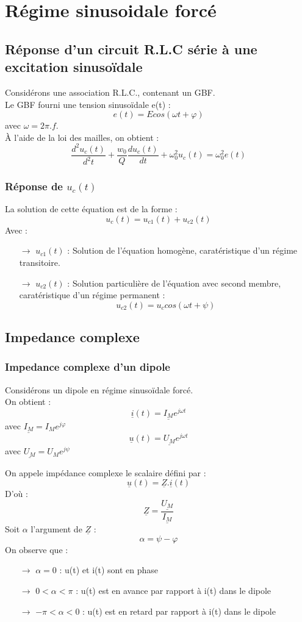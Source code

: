 \chapter{Régime sinusoidale forcé}
\section{Réponse d'un circuit R.L.C série à une excitation sinusoïdale}
Considérons une association R.L.C., contenant un GBF.\\
Le GBF fourni une tension sinusoïdale e(t) :
$$e(t) = Ecos(\omega t +\varphi)$$
avec $\omega = 2\pi.f$.\\
À l'aide de la loi des mailles, on obtient :
$$\dfrac{d^2u_c(t)}{d^2t} + \dfrac{w_0}{Q}\dfrac{du_c(t)}{dt} + \omega_0^2u_c(t) = \omega_0^2e(t)$$
\subsection{Réponse de $u_c(t)$}
La solution de cette équation est de la forme :
$$u_c(t) = u_{c1}(t) + u_{c2}(t)$$
Avec : 
\begin{itemize}
 \item[$\rightarrow$] $u_{c1}(t)$ : Solution de l'équation homogène, caratéristique d'un régime transitoire.
 \item[$\rightarrow$] $u_{c2}(t)$ : Solution particulière de l'équation avec second membre, caratéristique d'un régime permanent :
$$u_{c2}(t) = u_ccos(\omega t+\psi)$$
\end{itemize}
\section{Impedance complexe}
\subsection{Impedance complexe d'un dipole}
Considérons un dipole en régime sinusoïdale forcé.\\
On obtient :
$$\underline{i}(t) = \underline{I_M}e^{j\omega t}$$
avec $\underline{I_M} = I_Me^{j\varphi}$
$$\underline{u}(t) = \underline{U_M}e^{j\omega t}$$
avec $\underline{U_M} = U_Me^{j\psi}$\\
\begin{de}
On appele impédance complexe le scalaire défini par :
$$\underline{u}(t) = \underline{Z}.\underline{i}(t)$$
D'où :
$$\underline{Z} = \dfrac{\underline{U_M}}{\underline{I_M}}$$
Soit $\alpha$ l'argument de $\underline{Z}$ :
$$\alpha = \psi - \varphi$$
On observe que : 
\begin{itemize}
 \item[$\rightarrow$] $\alpha = 0$ : u(t) et i(t) sont en phase
 \item[$\rightarrow$] $0 < \alpha < \pi$ : u(t) est en avance par rapport à i(t) dans le dipole
 \item[$\rightarrow$] $-\pi < \alpha < 0$ : u(t) est en retard par rapport à i(t) dans le dipole
\end{itemize}
\end{de}
